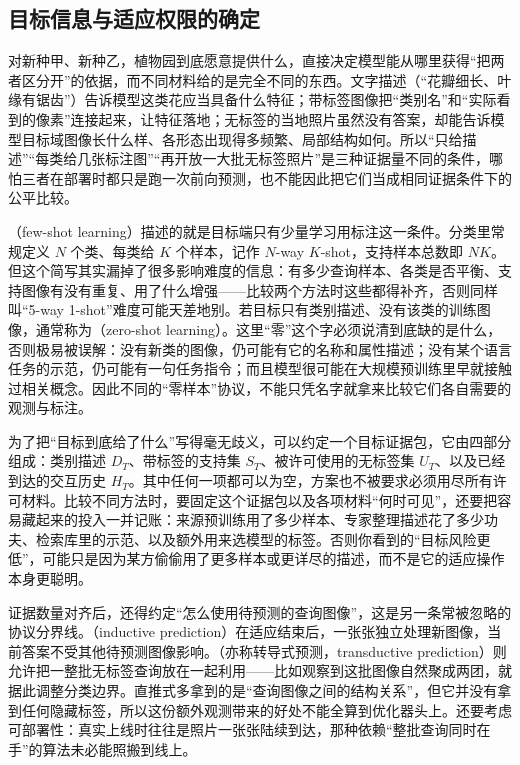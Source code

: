 \subsection{目标信息与适应权限的确定}
\label{sec:ket-transfer-evidence}

对新种甲、新种乙，植物园到底愿意提供什么，直接决定模型能从哪里获得“把两者区分开”的依据，而不同材料给的是完全不同的东西。文字描述（“花瓣细长、叶缘有锯齿”）告诉模型这类花应当具备什么特征；带标签图像把“类别名”和“实际看到的像素”连接起来，让特征落地；无标签的当地照片虽然没有答案，却能告诉模型目标域图像长什么样、各形态出现得多频繁、局部结构如何。所以“只给描述”“每类给几张标注图”“再开放一大批无标签照片”是三种证据量不同的条件，哪怕三者在部署时都只是跑一次前向预测，也不能因此把它们当成相同证据条件下的公平比较。

（few-shot learning）描述的就是目标端只有少量学习用标注这一条件。分类里常规定义 $N$ 个类、每类给 $K$ 个样本，记作 $N$-way $K$-shot，支持样本总数即 $NK$。但这个简写其实漏掉了很多影响难度的信息：有多少查询样本、各类是否平衡、支持图像有没有重复、用了什么增强——比较两个方法时这些都得补齐，否则同样叫“5-way 1-shot”难度可能天差地别。若目标只有类别描述、没有该类的训练图像，通常称为（zero-shot learning）。这里“零”这个字必须说清到底缺的是什么，否则极易被误解：没有新类的图像，仍可能有它的名称和属性描述；没有某个语言任务的示范，仍可能有一句任务指令；而且模型很可能在大规模预训练里早就接触过相关概念。因此不同的“零样本”协议，不能只凭名字就拿来比较它们各自需要的观测与标注。

为了把“目标到底给了什么”写得毫无歧义，可以约定一个目标证据包，它由四部分组成：类别描述 $D_T$、带标签的支持集 $S_T$、被许可使用的无标签集 $U_T$、以及已经到达的交互历史 $H_T$。其中任何一项都可以为空，方案也不被要求必须用尽所有许可材料。比较不同方法时，要固定这个证据包以及各项材料“何时可见”，还要把容易藏起来的投入一并记账：来源预训练用了多少样本、专家整理描述花了多少功夫、检索库里的示范、以及额外用来选模型的标签。否则你看到的“目标风险更低”，可能只是因为某方偷偷用了更多样本或更详尽的描述，而不是它的适应操作本身更聪明。

证据数量对齐后，还得约定“怎么使用待预测的查询图像”，这是另一条常被忽略的协议分界线。（inductive prediction）在适应结束后，一张张独立处理新图像，当前答案不受其他待预测图像影响。（亦称转导式预测，transductive prediction）则允许把一整批无标签查询放在一起利用——比如观察到这批图像自然聚成两团，就据此调整分类边界。直推式多拿到的是“查询图像之间的结构关系”，但它并没有拿到任何隐藏标签，所以这份额外观测带来的好处不能全算到优化器头上。还要考虑可部署性：真实上线时往往是照片一张张陆续到达，那种依赖“整批查询同时在手”的算法未必能照搬到线上。

